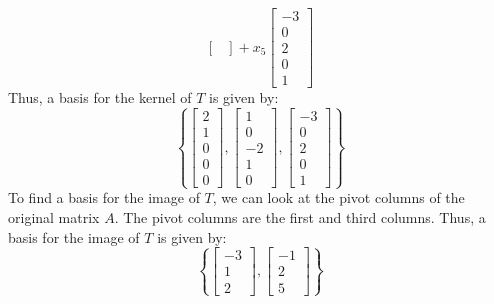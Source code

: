\begin{eg}
\[\begin{bmatrix}
    \end{bmatrix} + x_5 \begin{bmatrix}
        -3 \\ 0 \\ 2 \\ 0 \\ 1
    \end{bmatrix} \]
    Thus, a basis for the kernel of $T$ is given by:
    \[ \left\{ \begin{bmatrix}
        2 \\ 1 \\ 0 \\ 0 \\ 0
    \end{bmatrix}, \begin{bmatrix}
        1 \\ 0 \\ -2 \\ 1 \\ 0
    \end{bmatrix}, \begin{bmatrix}
        -3 \\ 0 \\ 2 \\ 0 \\ 1
    \end{bmatrix} \right\} \]
    To find a basis for the image of $T$, we can look at the pivot columns of the original matrix $A$. The pivot columns are the first and third columns. Thus, a basis for the image of $T$ is given by:
    \[ \left\{ \begin{bmatrix}
        -3 \\ 1 \\ 2
    \end{bmatrix}, \begin{bmatrix}
        -1 \\ 2 \\ 5
    \end{bmatrix} \right\} \]
\end{eg}

